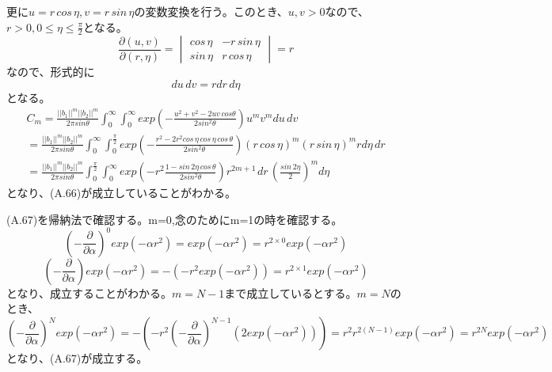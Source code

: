 \documentclass{jsarticle}
\begin{document}
更に$u = r\,cos\,\eta, v = r\,sin\,\eta$の変数変換を行う。このとき、$u,v>0$なので、$r>0, 0 \leq \eta \leq \frac{\pi}{2}$となる。
\begin{equation}
\frac{\partial (u, v)}{\partial(r, \eta)} = 
\begin{vmatrix}
cos\,\eta & -r\,sin\,\eta\\
sin\,\eta & r\,cos\,\eta
\end{vmatrix}
= r
\end{equation}
なので、形式的に
\begin{equation}
du\,dv = r dr \, d\eta
\end{equation}
となる。
\begin{equation}
\begin{split}
C_m 
= \frac{||b_1||^m ||b_2||^m }{2\pi{sin\theta}} \int_{0}^{\infty} \int_{0}^{\infty} exp(-\frac{u^2 + v^2 - 2uv\,cos\theta}{2sin^2\theta}) 
u^m v^m du\,dv\\
= \frac{||b_1||^m ||b_2||^m }{2\pi{sin\theta}} \int_{0}^{\infty} \int_{0}^{\frac{\pi}{2}} exp(-\frac{r^2 - 2r^2 cos\,\eta\,cos\,\eta\,cos\,\theta}{2sin^2\theta}) (r\,cos\,\eta)^m (r\,sin\,\eta)^m r d\eta\,dr\\
= \frac{||b_1||^m ||b_2||^m }{2\pi{sin\theta}} \int_{0}^{\frac{\pi}{2}} \int_{0}^{\infty} exp(-r^2\frac{ 1- sin\,2\eta \,cos\,\theta}{2sin^2\theta}) r^{2m+1\,}dr \, (\frac{sin\,2\eta}{2})^m d\eta
\end{split}
\end{equation}
となり、(A.66)が成立していることがわかる。

(A.67)を帰納法で確認する。m=0,念のためにm=1の時を確認する。
\begin{equation}
(-\frac{\partial}{\partial\alpha})^0 exp(-\alpha r^2) = exp(-\alpha r^2) = r^{2\times0} exp(-\alpha r^2)
\end{equation}
\begin{equation}
(-\frac{\partial}{\partial\alpha}) exp(-\alpha r^2) = -(-r^2 exp(-\alpha r^2)) = r^{2\times1} exp(-\alpha r^2)
\end{equation}
となり、成立することがわかる。$m = N -1$まで成立しているとする。$m = N$のとき、
\begin{equation}
(-\frac{\partial}{\partial\alpha})^N exp(-\alpha r^2) = -(-r^2(-\frac{\partial}{\partial\alpha})^{N-1}(2 exp(-\alpha r^2))) 
= r^2 r^{2(N-1)}exp(-\alpha r^2)
= r^{2N} exp(-\alpha r^2)
\end{equation}
となり、(A.67)が成立する。
\end{document}
